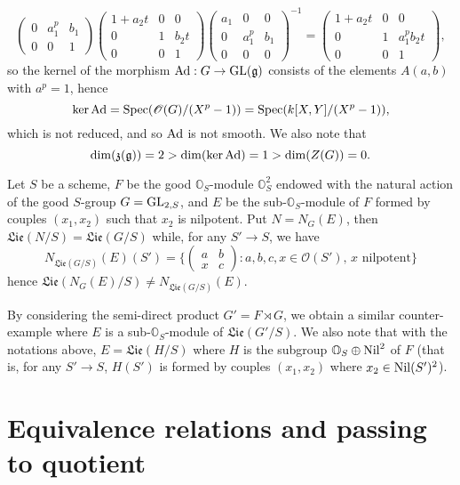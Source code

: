 \begin{example}
\[\begin{pmatrix}
0&a_1^p&b_1\\
0&0&1
\end{pmatrix}\begin{pmatrix}
1+a_2t&0&0\\
0&1&b_2t\\
0&0&1
\end{pmatrix}\begin{pmatrix}
a_1&0&0\\
0&a_1^p&b_1\\
0&0&0
\end{pmatrix}^{-1}=\begin{pmatrix}
1+a_2t&0&0\\
0&1&a_1^pb_2t\\
0&0&1
\end{pmatrix},\]
so the kernel of the morphism $\mathrm{Ad}:G\to\mathrm{GL}(\mathfrak{g})$ consists of the elements $A(a,b)$ with $a^p=1$, hence
\[\operatorname{ker}\mathrm{Ad}=\mathrm{Spec}(\mathscr{O}(G)/(X^p-1))=\mathrm{Spec}(k[X,Y]/(X^p-1)),\]
which is not reduced, and so $\mathrm{Ad}$ is not smooth. We also note that
\[\dim(\mathfrak{z}(\mathfrak{g}))=2>\dim(\operatorname{ker}\mathrm{Ad})=1>\dim(Z(G))=0.\]
\end{example}

\begin{example}\label{scheme group Lie and normalizer nonequal example}
Let $S$ be a scheme, $F$ be the good $\mathbb{O}_S$-module $\mathbb{O}_S^2$ endowed with the natural action of the good $S$-group $G=\mathrm{GL}_{2,S}$, and $E$ be the sub-$\mathbb{O}_S$-module of $F$ formed by couples $(x_1,x_2)$ such that $x_2$ is nilpotent. Put $N=N_G(E)$, then $\mathfrak{Lie}(N/S)=\mathfrak{Lie}(G/S)$ while, for any $S'\to S$, we have
\[N_{\mathfrak{Lie}(G/S)}(E)(S')=\Big\{\begin{pmatrix}
a&b\\
x&c
\end{pmatrix}:\text{$a,b,c,x\in\mathscr{O}(S')$, $x$ nilpotent}\Big\}\]
hence $\mathfrak{Lie}(N_G(E)/S)\neq N_{\mathfrak{Lie}(G/S)}(E)$.\par
By considering the semi-direct product $G'=F\rtimes G$, we obtain a similar counter-example where $E$ is a sub-$\mathbb{O}_S$-module of $\mathfrak{Lie}(G'/S)$. We also note that with the notations above, $E=\mathfrak{Lie}(H/S)$ where $H$ is the subgroup $\mathbb{O}_S\oplus\mathrm{Nil}^2$ of $F$ (that is, for any $S'\to S$, $H(S')$ is formed by couples $(x_1,x_2)$ where $x_2\in\mathrm{Nil}(S')^2$).
\end{example}

\section{Equivalence relations and passing to quotient}\label{category equivalence relation and quotient section}
